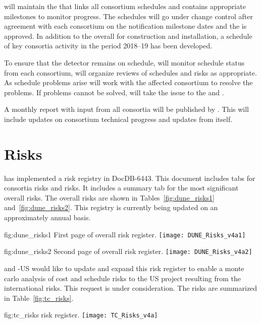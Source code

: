  will maintain the  that links all consortium schedules
and contains appropriate milestones to monitor progress.
The schedules will go under change control after agreement with each
consortium on the notification milestone dates and the  is
approved.
In addition to the overall  for construction and
installation, a schedule of key consortia activity in the period
2018--19  has been developed.

To ensure that the  detector remains on schedule,
 will monitor schedule status from each consortium, will organize
reviews of schedules and risks as appropriate.  As schedule problems
arise  will work with the affected consortium to resolve the
problems. If problems cannot be solved,  will take the issue to the
 and .

A monthly report with input from all consortia will be published by
. This will include updates on consortium technical progress and
updates from  itself.

\section{Risks}
\label{sec:fdsp-coord-risks}

 has implemented a risk registry in
DocDB-6443. This document includes tabs for consortia risks
and  risks. It includes a summary tab for the most significant overall
 risks. The overall  risks are shown in
Tables~\ref{fig:dune_risks1} and~\ref{fig:dune_risks2}. This registry
is currently being updated on an approximately annual basis.
\begin{dunefigure}{fig:dune_risks1}
  {First page of  overall risk register.}
  \texttt{[image: DUNE\_Risks\_v4a1]}
\end{dunefigure}
\begin{dunefigure}{fig:dune_risks2}
  {Second page of  overall risk register.}
  \texttt{[image: DUNE\_Risks\_v4a2]}
\end{dunefigure}
 and -US would like  to update and
expand this risk register to enable a monte carlo analysis of cost and
schedule risks to the US project resulting from the international
 risks. This request is under consideration.
The  risks are summarized in Table~\ref{fig:tc_risks}.
\begin{dunefigure}{fig:tc_risks}
  { risk register.}
  \texttt{[image: TC\_Risks\_v4a]}
\end{dunefigure}


